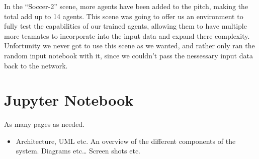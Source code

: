 In the “Soccer-2” scene, more agents have been added to the pitch, making the total add up to 14 agents. This scene was going to offer us an environment to fully test the capabilities of our trained agents, allowing them to have multiple more teamates to incorporate into the input data and expand there complexity. Unfortunity we never got to use this scene as we wanted, and rather only ran the random input notebook with it, since we couldn’t pass the nessessary input data back to the network.

\section{Jupyter Notebook}



As many pages as needed.
\begin{itemize}
\item Architecture, UML etc. An overview of the different components of the system. Diagrams etc… Screen shots etc.
\end{itemize}


